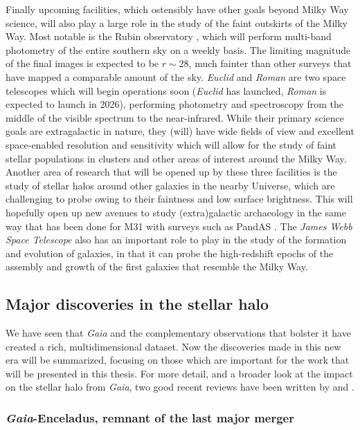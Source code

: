 Finally upcoming facilities, which ostensibly have other goals beyond Milky Way science, will also play a large role in the study of the faint outskirts of the Milky Way. Most notable is the Rubin observatory \parencite{lsst}, which will perform multi-band photometry of the entire southern sky on a weekly basis. The limiting magnitude of the final images is expected to be $r \sim 28$, much fainter than other surveys that have mapped a comparable amount of the sky. \textit{Euclid} and \textit{Roman} are two space telescopes which will begin operations soon (\textit{Euclid} has launched, \textit{Roman} is expected to launch in 2026), performing photometry and spectroscopy from the middle of the visible spectrum to the near-infrared. While their primary science goals are extragalactic in nature, they (will) have wide fields of view and excellent space-enabled resolution and sensitivity which will allow for the study of faint stellar populations in clusters and other areas of interest around the Milky Way. Another area of research that will be opened up by these three facilities is the study of stellar halos around other galaxies in the nearby Universe, which are challenging to probe owing to their faintness and low surface brightness. This will hopefully open up new avenues to study (extra)galactic archaeology in the same way that has been done for M31 with surveys such as PandAS \parencite{mcconnachie09}. The \textit{James Webb Space Telescope} also has an important role to play in the study of the formation and evolution of galaxies, in that it can probe the high-redshift epochs of the assembly and growth of the first galaxies that resemble the Milky Way.

\subsection{Major discoveries in the stellar halo}

We have seen that \textit{Gaia} and the complementary observations that bolster it have created a rich, multidimensional dataset. Now the discoveries made in this new era will be summarized, focusing on those which are important for the work that will be presented in this thesis. For more detail, and a broader look at the impact on the stellar halo from \textit{Gaia}, two good recent reviews have been written by \textcite{helmi20} and \textcite{deason24}.

\subsubsection{\textit{Gaia}-Enceladus, remnant of the last major merger}

